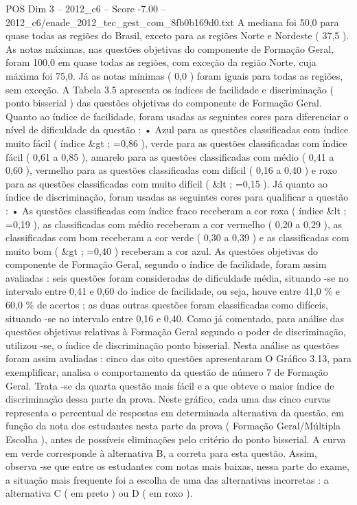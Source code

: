 \begin{textsample}{POS Dim 3 – 2012\_c6 – Score -7.00 – 2012\_c6/enade\_2012\_tec\_gest\_com\_8fb0b169d0.txt}
A mediana foi 50,0 para quase todas as regiões do Brasil, exceto para as regiões Norte e Nordeste ( 37,5 ).
As notas máximas, nas questões objetivas do componente de Formação Geral, foram 100,0 em quase todas as regiões, com exceção da região Norte, cuja máxima foi 75,0.
Já as notas mínimas ( 0,0 ) foram iguais para todas as regiões, sem exceção.
A Tabela 3.5 apresenta os índices de facilidade e discriminação ( ponto bisserial ) das questões objetivas do componente de Formação Geral.
Quanto ao índice de facilidade, foram usadas as seguintes cores para diferenciar o nível de dificuldade da questão : • Azul para as questões classificadas com índice muito fácil ( índice \&gt ; =0,86 ), verde para as questões classificadas com índice fácil ( 0,61 a 0,85 ), amarelo para as questões classificadas com médio ( 0,41 a 0,60 ), vermelho para as questões classificadas com difícil ( 0,16 a 0,40 ) e roxo para as questões classificadas com muito difícil ( \&lt ; =0,15 ).
Já quanto ao índice de discriminação, foram usadas as seguintes cores para qualificar a questão : • As questões classificadas com índice fraco receberam a cor roxa ( índice \&lt ; =0,19 ), as classificadas com médio receberam a cor vermelho ( 0,20 a 0,29 ), as classificadas com bom receberam a cor verde ( 0,30 a 0,39 ) e as classificadas com muito bom ( \&gt ; =0,40 ) receberam a cor azul.
As questões objetivas do componente de Formação Geral, segundo o índice de facilidade, foram assim avaliadas : seis questões foram consideradas de dificuldade média, situando -se no intervalo entre 0,41 e 0,60 do índice de facilidade, ou seja, houve entre 41,0 \% e 60,0 \% de acertos ; as duas outras questões foram classificadas como difíceis, situando -se no intervalo entre 0,16 e 0,40.
Como já comentado, para análise das questões objetivas relativas à Formação Geral segundo o poder de discriminação, utilizou -se, o índice de discriminação ponto bisserial.
Nesta análise as questões foram assim avaliadas : cinco das oito questões apresentaram O Gráfico 3.13, para exemplificar, analisa o comportamento da questão de número 7 de Formação Geral.
Trata -se da quarta questão mais fácil e a que obteve o maior índice de discriminação dessa parte da prova.
Neste gráfico, cada uma das cinco curvas representa o percentual de respostas em determinada alternativa da questão, em função da nota dos estudantes nesta parte da prova ( Formação Geral/Múltipla Escolha ), antes de possíveis eliminações pelo critério do ponto bisserial.
A curva em verde corresponde à alternativa B, a correta para esta questão.
Assim, observa -se que entre os estudantes com notas mais baixas, nessa parte do exame, a situação mais frequente foi a escolha de uma das alternativas incorretas : a alternativa C ( em preto ) ou D ( em roxo ).

\end{textsample}
